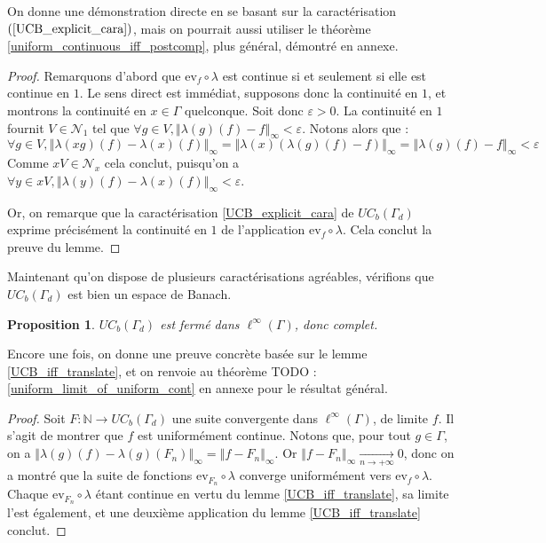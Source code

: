 \documentclass[a4paper,12pt]{article}
\newtheorem{proposition}[theorem]{Proposition}
\newcommand{\N}{\mathbb{N}}
\newcommand{\ev}{\mathrm{ev}}
\newcommand{\norm}[1]{\left\Vert #1\right\Vert}
\newcommand{\ssi}{si et seulement si }
\newcommand{\comp}{\circ}
\newcommand{\nhds}{\mathcal{N}}
\newcommand{\TODO}[1]{{\color{red}TODO :} #1}
\begin{document}
On donne une démonstration directe en se basant sur la caractérisation $(\ref{UCB_explicit_cara})$, mais on 
pourrait aussi utiliser le théorème \ref{uniform_continuous_iff_postcomp}, plus général, démontré en annexe.

\begin{proof}
    Remarquons d'abord que $\ev_f\comp\lambda$ est continue \ssi elle est continue en $1$. Le sens direct est immédiat, supposons donc 
    la continuité en $1$, et montrons la continuité en $x\in\Gamma$ quelconque. Soit donc $\varepsilon>0$. La continuité en $1$ fournit 
    $V\in\nhds_1$ tel que $\forall g\in V, \norm{\lambda(g)(f) - f}_\infty<\varepsilon$. Notons alors que :
    \begin{equation*}
        \forall g\in V, \norm{\lambda(xg)(f) - \lambda(x)(f)}_\infty = \norm{\lambda(x)(\lambda(g)(f) - f)}_\infty = \norm{\lambda(g)(f) - f}_\infty < \varepsilon
    \end{equation*}
    Comme $xV\in\nhds_x$ cela conclut, puisqu'on a $\forall y\in xV, \norm{\lambda(y)(f) - \lambda(x)(f)}_\infty < \varepsilon$.

    Or, on remarque que la caractérisation \ref{UCB_explicit_cara} de $UC_b(\Gamma_d)$ exprime précisément la continuité en $1$ de l'application $\ev_f\comp\lambda$.
    Cela conclut la preuve du lemme.
\end{proof}

Maintenant qu'on dispose de plusieurs caractérisations agréables, vérifions que $UC_b(\Gamma_d)$ est bien un espace de Banach.

\begin{proposition}\label{UCB_complete}
    $UC_b(\Gamma_d)$ est fermé dans $\ell^\infty(\Gamma)$, donc complet.
\end{proposition}

Encore une fois, on donne une preuve concrète basée sur le lemme \ref{UCB_iff_translate}, et on renvoie au théorème \TODO{\ref{uniform_limit_of_uniform_cont}}
en annexe pour le résultat général.

\begin{proof}
    Soit $F:\N\to UC_b(\Gamma_d)$ une suite convergente dans $\ell^\infty(\Gamma)$, de limite $f$.
    Il s'agit de montrer que $f$ est uniformément continue. Notons que, pour tout $g\in\Gamma$, on a $\norm{\lambda(g)(f) - \lambda(g)(F_n)}_\infty = \norm{f - F_n}_\infty$.
    Or $\norm{f - F_n}_\infty\xrightarrow[n\to+\infty]{}0$, donc on a montré que la suite de fonctions $\ev_{F_n}\comp\lambda$ converge 
    uniformément vers $\ev_f\comp\lambda$. Chaque $\ev_{F_n}\comp\lambda$ étant continue en vertu du lemme \ref{UCB_iff_translate},
    sa limite l'est également, et une deuxième application du lemme \ref{UCB_iff_translate} conclut.
\end{proof}
\end{document}
